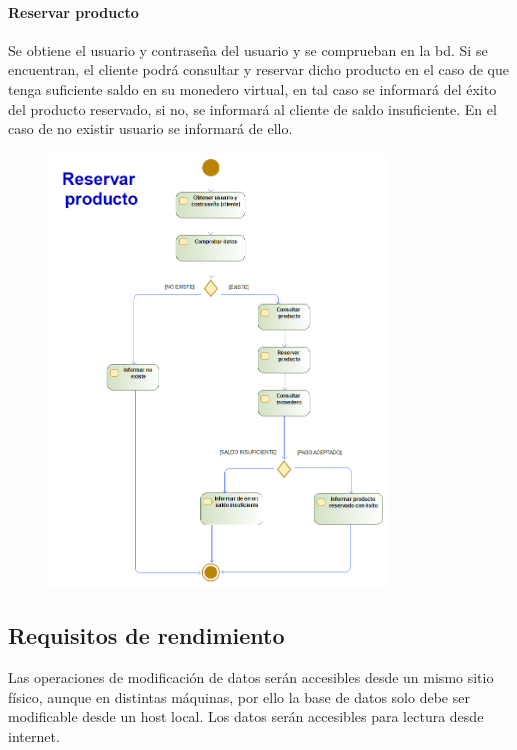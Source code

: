 \paragraph{Reservar producto}
Se obtiene el usuario y contraseña del usuario y se comprueban en la \gls{bd}. Si se encuentran, el cliente podrá consultar y reservar dicho producto en el caso de que tenga suficiente saldo en su monedero virtual, en tal caso se informará del éxito del producto reservado, si no, se informará al cliente de saldo insuficiente. En el caso de no existir usuario se informará de ello.
\begin{figure}[H]
    \centering
    \includegraphics[width=0.8\textwidth]{Use_Cases/reservar_producto.png}
\end{figure}
\newpage
\subsection{Requisitos de rendimiento}
Las operaciones de modificación de datos serán accesibles desde un mismo sitio físico, aunque en distintas máquinas, por ello la base de datos solo debe ser modificable desde un \gls{host} local. Los datos serán accesibles para lectura desde internet.
